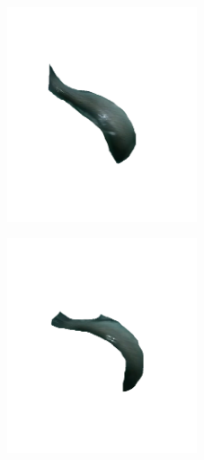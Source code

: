 \begin{enumerate}
\begin{figure}[H]
\begin{subfigure}[b]{\textwidth}
\begin{subfigure}[b]{0.25\textwidth}
                    \label{fig:Vacio2}
                \end{subfigure}
                \begin{subfigure}[b]{0.25\textwidth}
                    \centering
                    \includegraphics[width=0.8\textwidth]{images/6/Vacio3.png}
                    \label{fig:Vacio3}
                \end{subfigure}
                \begin{subfigure}[b]{0.25\textwidth}
                    \centering
                    \includegraphics[width=0.8\textwidth]{images/6/Vacio4.png}

\end{subfigure}
\end{subfigure}
\end{figure}
\end{enumerate}

